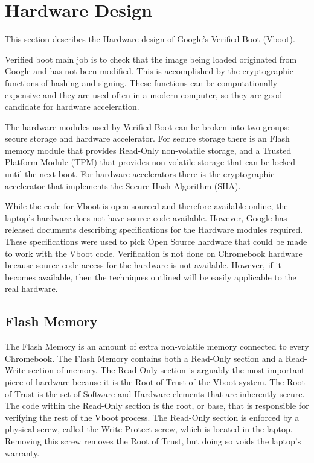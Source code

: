 \chapter{Hardware Design}

This section describes the Hardware design of Google's Verified Boot (Vboot). 

Verified boot main job is to check that the image being loaded originated from
Google and has not been modified. 
This is accomplished by the cryptographic functions of hashing and signing.
These functions can be computationally expensive and they are used often in a
modern computer, so they are good candidate for hardware acceleration.  

The hardware modules used by Verified Boot can be broken into two groups: secure storage and hardware accelerator.
For secure storage there is an Flash memory module that provides 
Read-Only non-volatile storage, and a Trusted Platform Module (TPM) that provides non-volatile storage that can be locked until the next boot.
For hardware accelerators there is the cryptographic accelerator that
implements the Secure Hash Algorithm (SHA).

While the code for Vboot is open sourced and therefore available online, the laptop's
hardware does not have source code available.
However, Google has released documents describing specifications for the
Hardware modules required. 
These specifications were used to pick Open Source hardware that could be made
to work with the Vboot code. 
Verification is not done on Chromebook hardware because source code access for
the hardware is not available. 
However, if it becomes available, then the techniques outlined will be easily
applicable to the real hardware. 

\section{Flash Memory}\label{flash_mem}

The Flash Memory is an amount of extra non-volatile memory connected to every Chromebook. 
The Flash Memory contains both a Read-Only section and a Read-Write section of memory.
The Read-Only section is arguably the most important piece of hardware because it is the Root of Trust of the Vboot system.
The Root of Trust is the set of Software and Hardware elements that are
inherently secure\cite{RoT}.
The code within the Read-Only section is the root, or base, that is responsible for verifying the rest of the Vboot process.
The Read-Only section is enforced by a physical screw, called the Write Protect screw, which is located in the laptop.
Removing this screw removes the Root of Trust, but doing so voids the laptop's warranty.

